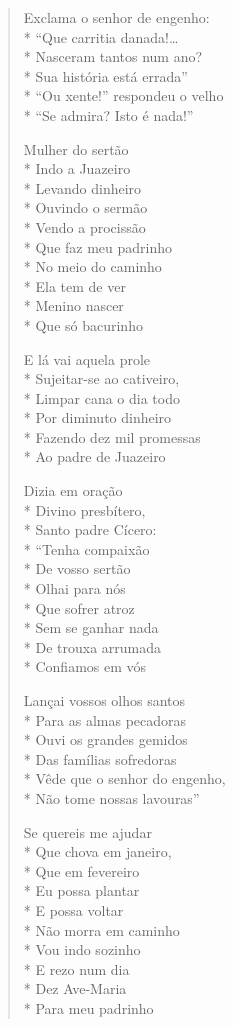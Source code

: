 \begin{verse}
Exclama o senhor de engenho:\\*
``Que carritia danada!\ldots{}\\*
Nasceram tantos num ano?\\*
Sua história está errada''\\*
``Ou xente!'' respondeu o velho\\*
``Se admira? Isto é nada!''

Mulher do sertão\\*
Indo a Juazeiro\\*
Levando dinheiro\\*
Ouvindo o sermão\\*
Vendo a procissão\\*
Que faz meu padrinho\\*
No meio do caminho\\*
Ela tem de ver\\*
Menino nascer\\*
Que só bacurinho

E lá vai aquela prole\\*
Sujeitar-se ao cativeiro,\\*
Limpar cana o dia todo\\*
Por diminuto dinheiro\\*
Fazendo dez mil promessas\\*
Ao padre de Juazeiro

Dizia em oração\\*
Divino presbítero,\\*
Santo padre Cícero:\\*
``Tenha compaixão\\*
De vosso sertão\\*
Olhai para nós\\*
Que sofrer atroz\\*
Sem se ganhar nada\\*
De trouxa arrumada\\*
Confiamos em vós

Lançai vossos olhos santos\\*
Para as almas pecadoras\\*
Ouvi os grandes gemidos\\*
Das famílias sofredoras\\*
Vêde que o senhor do engenho,\\*
Não tome nossas lavouras''

Se quereis me ajudar\\*
Que chova em janeiro,\\*
Que em fevereiro\\*
Eu possa plantar\\*
E possa voltar\\*
Não morra em caminho\\*
Vou indo sozinho\\*
E rezo num dia\\*
Dez Ave-Maria\\*
Para meu padrinho


\end{verse}
